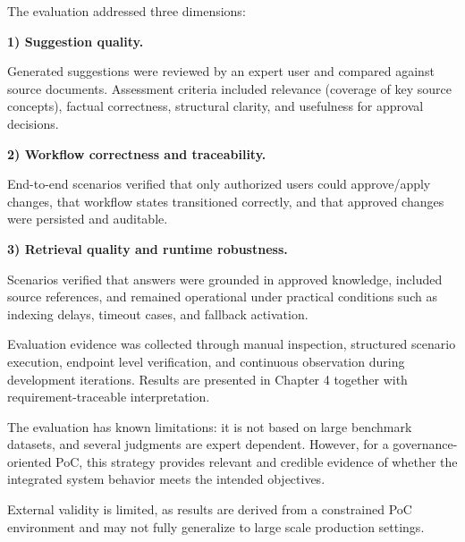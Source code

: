 The evaluation addressed three dimensions:

\vspace{0.4cm}
\textbf{1) Suggestion quality.}

Generated suggestions were reviewed by an expert user and compared against source documents.
Assessment criteria included relevance (coverage of key source concepts), factual correctness, structural clarity, and usefulness for approval decisions.

\textbf{2) Workflow correctness and traceability.}

End-to-end scenarios verified that only authorized users could approve/apply changes, that workflow states transitioned correctly, and that approved changes were persisted and auditable.

\textbf{3) Retrieval quality and runtime robustness.}

Scenarios verified that answers were grounded in approved knowledge, included source references, and remained operational under practical conditions such as indexing delays, timeout cases, and fallback activation.

\vspace{0.5cm}

Evaluation evidence was collected through manual inspection, structured scenario execution, endpoint level verification, and continuous observation during development iterations.
Results are presented in Chapter 4 together with requirement-traceable interpretation.

The evaluation has known limitations: it is not based on large benchmark datasets, and several judgments are expert dependent.
However, for a governance-oriented PoC, this strategy provides relevant and credible evidence of whether the integrated system behavior meets the intended objectives.

External validity is limited, as results are derived from a constrained PoC environment and may not fully generalize to large scale production settings.